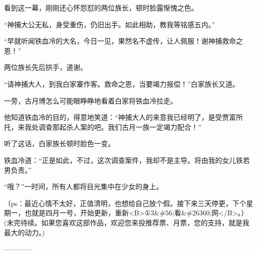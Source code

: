 \begin{this_body}
看到这一幕，刚刚还心怀怨怼的两位族长，顿时脸露惭愧之色。

“神捕大公无私，身受重伤，仍旧出手。如此相助，教我等铭感五内。”

“早就听闻铁血冷的大名，今日一见，果然名不虚传，让人佩服！谢神捕救命之恩！”

两位族长先后拱手，道谢。

“请神捕大人，到我白家寨作客。救命之恩，当要竭力报偿！”白家族长又道。

一旁，古月博怎么可能眼睁睁地看着白家将铁血冷拉走。

他知道铁血冷的目的，得意地笑道：“神捕大人的来意我已经明了，是受贾富所托，来我处调查那起杀人案的吧。我们古月一族一定竭力配合！”

听了这话，白家族长顿时脸色一变。

铁血冷道：“正是如此，不过，这次调查案件，我却不是主导。将由我的女儿铁若男负责。”

“哦？”一时间，所有人都将目光集中在少女的身上。

（ps：最近心情不太好，正值清明，也想给自己放个假。接下来三天停更，下个星期一，也就是四月一号，开始更新，重新<B>①3\&\#56;看\&\#26360;网</B>。）(未完待续。如果您喜欢这部作品，欢迎您来投推荐票、月票，您的支持，就是我最大的动力。)

------------

\end{this_body}

